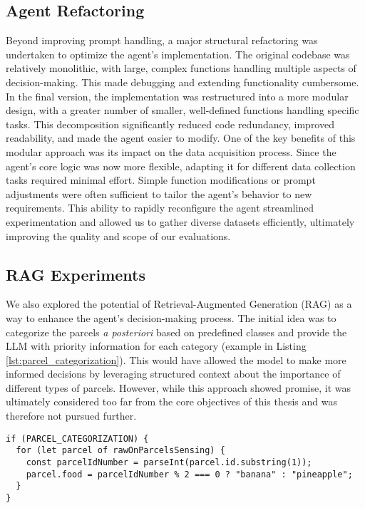 \subsection{Agent Refactoring}
Beyond improving prompt handling, a major structural refactoring was undertaken
to optimize the agent's implementation. The original codebase was relatively monolithic,
with large, complex functions handling multiple aspects of decision-making. This
made debugging and extending functionality cumbersome. In the final version, the
implementation was restructured into a more modular design, with a greater number
of smaller, well-defined functions handling specific tasks. This decomposition significantly
reduced code redundancy, improved readability, and made the agent easier to modify.
One of the key benefits of this modular approach was its impact on the data
acquisition process. Since the agent's core logic was now more flexible,
adapting it for different data collection tasks required minimal effort. Simple function
modifications or prompt adjustments were often sufficient to tailor the agent's behavior
to new requirements. This ability to rapidly reconfigure the agent streamlined
experimentation and allowed us to gather diverse datasets efficiently, ultimately
improving the quality and scope of our evaluations.

\subsection{RAG Experiments}
We also explored the potential of Retrieval-Augmented Generation (RAG) as a way to
enhance the agent's decision-making process. The initial idea was to categorize
the parcels \emph{a posteriori} based on predefined classes and provide the LLM with
priority information for each category (example in Listing
\ref{lst:parcel_categorization}). This would have allowed the model to make more
informed decisions by leveraging structured context about the importance of
different types of parcels. However, while this approach showed promise, it was ultimately
considered too far from the core objectives of this thesis and was therefore not
pursued further.

\vspace{1mm}
\begin{codewindow}
    \begin{lstlisting}
if (PARCEL_CATEGORIZATION) {
  for (let parcel of rawOnParcelsSensing) {
    const parcelIdNumber = parseInt(parcel.id.substring(1));
    parcel.food = parcelIdNumber % 2 === 0 ? "banana" : "pineapple";
  }
}
\end{lstlisting}
\end{codewindow}
\vspace{1mm}

